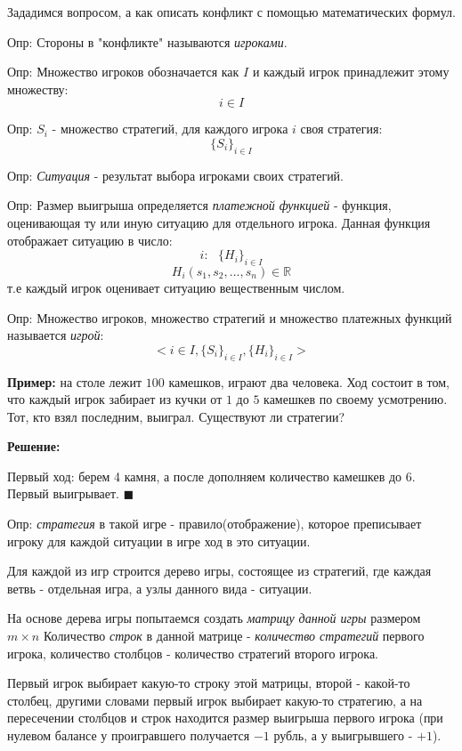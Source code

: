 \documentclass[aps,%
12pt,%
final,%
oneside,
onecolumn,%
musixtex, %
superscriptaddress,%
centertags]{article} %
\begin{document}
Зададимся вопросом, а как описать конфликт с помощью математических формул. 

Опр: Стороны в "конфликте"  называются \textit{игроками}.

Опр: Множество игроков обозначается как $I$ и каждый игрок принадлежит этому множеству:
$$i \in I$$ 

Опр: $S_i$ - множество стратегий, для каждого игрока $i$ своя стратегия: 
$$ \{S_i\}_{i \in I }$$

Опр: \textit{Ситуация} - результат выбора игроками своих стратегий. 

Опр: Размер выигрыша определяется \textit{платежной функцией} - функция, оценивающая ту или иную ситуацию для отдельного игрока. Данная функция отображает ситуацию в число:
$$ i: \text{ } \{H_i\}_{i \in I }$$ 
$$ H_{i} (s_1,s_2, ..., s_n) \in \mathbb{R}$$
т.е каждый игрок оценивает ситуацию вещественным числом.

Опр: Множество игроков, множество стратегий и множество платежных функций называется \textit{игрой}:
$$ <i \in I, \{S_i\}_{i \in I },\{H_i\}_{i \in I } > $$
 
\textbf{Пример:} на столе лежит $100$ камешков, играют два человека. Ход состоит в том, что каждый игрок забирает из кучки от $1$ до $5$ камешкев по своему усмотрению. Тот, кто взял последним, выиграл. Существуют ли стратегии?

\textbf{Решение:}

Первый ход: берем 4 камня, а после дополняем количество камешкев до 6. Первый выигрывает.
$\blacksquare$

Опр: \textit{стратегия} в такой игре - правило(отображение), которое преписывает игроку для каждой ситуации в игре ход в это ситуации.
\newpage

Для каждой из игр строится дерево игры, состоящее из стратегий, где каждая ветвь - отдельная игра, а узлы данного вида - ситуации.

На основе дерева игры попытаемся создать \textit{матрицу данной игры} размером $m \times n$ Количество \textit{строк} в данной матрице - \textit{количество стратегий} первого игрока, количество столбцов - количество стратегий второго игрока. 

Первый игрок выбирает какую-то строку этой матрицы, второй - какой-то столбец, другими словами первый игрок выбирает какую-то стратегию, а на пересечении столбцов и строк находится размер выигрыша первого игрока (при нулевом балансе у проигравшего получается $-1$ рубль, а у выигрывшего - $+1$).
\end{document}
